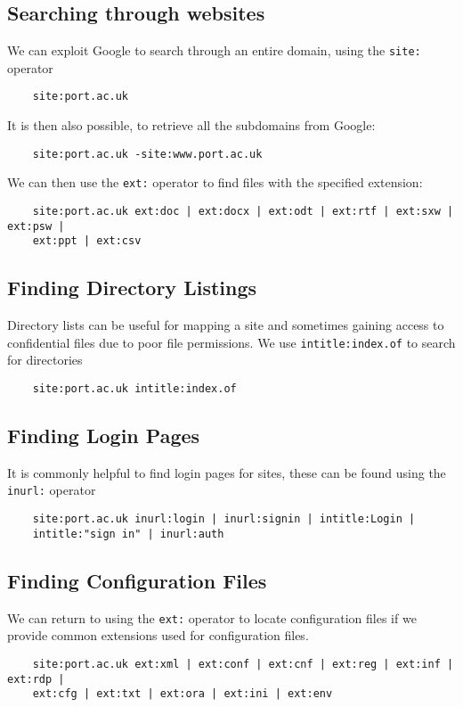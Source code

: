 \subsection{Searching through websites}
We can exploit Google to search through an entire domain, using the \verb|site:| operator
\begin{verbatim}
    site:port.ac.uk
\end{verbatim}
It is then also possible, to retrieve all the subdomains from Google:
\begin{verbatim}
    site:port.ac.uk -site:www.port.ac.uk
\end{verbatim}

We can then use the \verb|ext:| operator to find files with the specified extension:
\begin{verbatim}
    site:port.ac.uk ext:doc | ext:docx | ext:odt | ext:rtf | ext:sxw | ext:psw | 
    ext:ppt | ext:csv
\end{verbatim}

\subsection{Finding Directory Listings}
Directory lists can be useful for mapping a site and sometimes gaining access to confidential files due to poor file permissions. We use \verb|intitle:index.of| to search for directories
\begin{verbatim}
    site:port.ac.uk intitle:index.of
\end{verbatim}

\subsection{Finding Login Pages}
It is commonly helpful to find login pages for sites, these can be found using the \verb|inurl:| operator
\begin{verbatim}
    site:port.ac.uk inurl:login | inurl:signin | intitle:Login | 
    intitle:"sign in" | inurl:auth
\end{verbatim}

\subsection{Finding Configuration Files}
We can return to using the \verb|ext:| operator to locate configuration files if we provide common extensions used for configuration files. 
\begin{verbatim}
    site:port.ac.uk ext:xml | ext:conf | ext:cnf | ext:reg | ext:inf | ext:rdp | 
    ext:cfg | ext:txt | ext:ora | ext:ini | ext:env
\end{verbatim}

